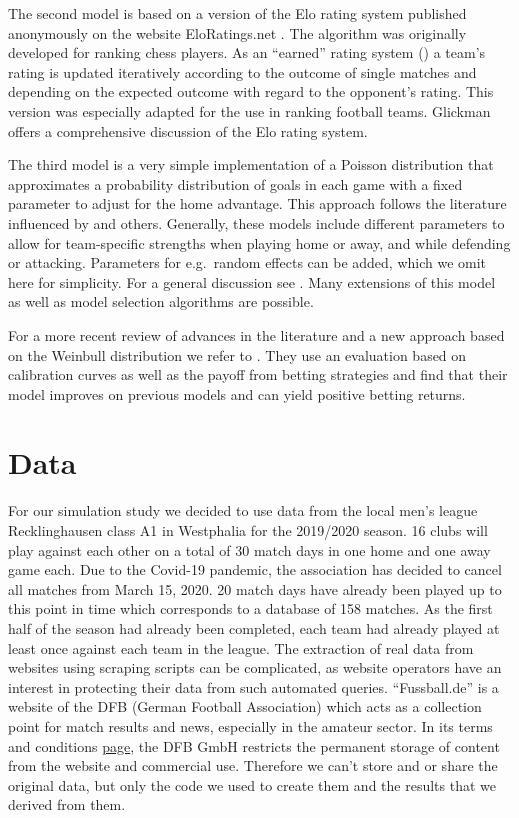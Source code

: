 \documentclass[12pt,a4paper]{article}
\begin{document}
The second model is based on a version of the Elo rating system
published anonymously on the website EloRatings.net
\autocite*{eloratings}. The algorithm was originally developed for
ranking chess players. As an \enquote{earned} rating system
(\textcite{lasek2013}) a team's rating is updated iteratively according
to the outcome of single matches and depending on the expected outcome
with regard to the opponent's rating. This version was especially
adapted for the use in ranking football teams. Glickman
\autocite*{glickman1995} offers a comprehensive discussion of the Elo
rating system.

The third model is a very simple implementation of a Poisson
distribution that approximates a probability distribution of goals in
each game with a fixed parameter to adjust for the home advantage. This
approach follows the literature influenced by \textcite{maher1982} and
others. Generally, these models include different parameters to allow
for team-specific strengths when playing home or away, and while
defending or attacking. Parameters for e.g.~random effects can be added,
which we omit here for simplicity. For a general discussion see
\textcite{karlis2003}. Many extensions of this model as well as model
selection algorithms are possible.

For a more recent review of advances in the literature and a new
approach based on the Weinbull distribution we refer to
\textcite{boshnakov2017}. They use an evaluation based on calibration
curves as well as the payoff from betting strategies and find that their
model improves on previous models and can yield positive betting
returns.

\hypertarget{data}{%
\section{Data}\label{data}}

For our simulation study we decided to use data from the local men's
league Recklinghausen class A1 in Westphalia for the 2019/2020 season.
16 clubs will play against each other on a total of 30 match days in one
home and one away game each. Due to the Covid-19 pandemic, the
association has decided to cancel all matches from March 15, 2020. 20
match days have already been played up to this point in time which
corresponds to a database of 158 matches. As the first half of the
season had already been completed, each team had already played at least
once against each team in the league. The extraction of real data from
websites using scraping scripts can be complicated, as website operators
have an interest in protecting their data from such automated queries.
\enquote{Fussball.de} is a website of the DFB (German Football
Association) which acts as a collection point for match results and
news, especially in the amateur sector. In its terms and conditions
\href{http://www.fussball.de/terms.and.conditions\#!/}{page}, the DFB
GmbH restricts the permanent storage of content from the website and
commercial use. Therefore we can't store and or share the original data,
but only the code we used to create them and the results that we derived
from them.
\end{document}
